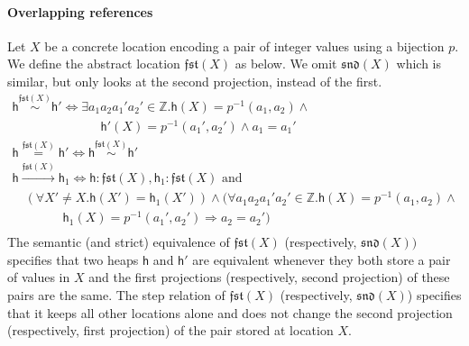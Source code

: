 \documentclass[nocopyrightspace,preprint]{sigplanconf}
\newcommand{\ints}{\mathbb{Z}}
\newcommand{\locHi}{\ensuremath{\mathfrak{snd}}\xspace}
\newcommand{\locLo}{\ensuremath{\mathfrak{fst}}\xspace}
\newcommand{\cloc}{\ensuremath{X}\xspace}
\newcommand\heap{\ensuremath{\mathsf{h}}\xspace}
\newcommand\h{\heap}
\newcommand\vval{\ensuremath{a}\xspace}
\newcommand\inR[2]{\ensuremath{#1:#2}}
\newcommand\rloc[3]{\ensuremath{#1 \stackrel{#3}{\sim} #2}}
\newcommand\rrloc[3]{\ensuremath{#1 \stackrel{#3}{=} #2}}
\newcommand\gloc[3]{\ensuremath{#1 \xrightarrow{#3}#2}}
\begin{document}
\paragraph{Overlapping references}
Let $\cloc$ be a concrete location encoding a pair of integer values using a bijection $p$.
We define the abstract location $\locLo(\cloc)$ as below. We omit $\locHi(\cloc)$ which is similar, but only looks at the second projection, instead of the first. 
\[
 \begin{array}{l}
  \rloc{\h}{\h'}{\locLo(\cloc)}  \iff 
   \exists \vval_1\vval_2\vval_1'\vval_2'\in\ints.
\heap(X) = p^{-1}(\vval_1, \vval_2) \land ~ \\ \qquad \qquad \qquad \quad \heap'(X) = p^{-1}(\vval_1', \vval_2') \land \vval_1 = \vval_1'\\[2pt]



\rrloc{\h}{\h'}{\locLo(\cloc)} \iff  \rloc{\h}{\h'}{\locLo(\cloc)} \\[2pt] 
\gloc{\h}{\h_1}{\locLo(\cloc)}  \iff \inR{\heap}{\locLo(\cloc)}, \inR{\heap_1}{\locLo(\cloc)} \textrm{ and }\\
  \quad (\forall \cloc' \neq \cloc.\heap(\cloc')=\heap_1(\cloc'))\wedge 
(\forall\vval_1\vval_2\vval_1'\vval_2'\in\ints.
\heap(X) = p^{-1}(\vval_1,\vval_2) \land~ \\ \qquad \qquad  \heap_1(X) = p^{-1}(\vval_1', \vval_2') \Rightarrow\vval_2 = \vval_2')\\[2pt]
  
\end{array}
\]
The semantic (and strict) equivalence of $\locLo(\cloc)$ (respectively,
$\locHi(\cloc))$ specifies that two heaps $\heap$ and $\heap'$ are
equivalent whenever they both store a pair of values in $\cloc$ and
the first projections (respectively, second projection) of these pairs
are the same.  The step relation of $\locLo(\cloc)$ (respectively,
$\locHi(\cloc)$) specifies that it keeps all other locations alone and
does not change the second projection (respectively, first projection)
of the pair stored at location $\cloc$.
\end{document}
